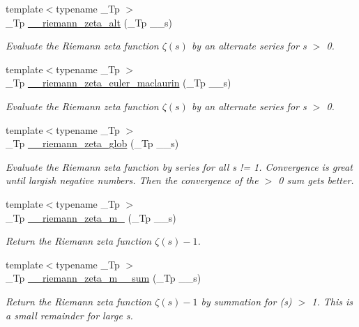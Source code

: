 \begin{DoxyCompactItemize}
{\footnotesize template$<$typename \+\_\+\+Tp $>$ }\\\+\_\+\+Tp \hyperlink{namespacestd_1_1____detail_a4b3f83cafed65af679eedcf37fefff00}{\+\_\+\+\_\+riemann\+\_\+zeta\+\_\+alt} (\+\_\+\+Tp \+\_\+\+\_\+s)
\begin{DoxyCompactList}\small\item\em Evaluate the Riemann zeta function $ \zeta(s) $ by an alternate series for s $>$ 0. \end{DoxyCompactList}\item 
{\footnotesize template$<$typename \+\_\+\+Tp $>$ }\\\+\_\+\+Tp \hyperlink{namespacestd_1_1____detail_a84ac805996c4eeb8cbfa181e6e47f0ae}{\+\_\+\+\_\+riemann\+\_\+zeta\+\_\+euler\+\_\+maclaurin} (\+\_\+\+Tp \+\_\+\+\_\+s)
\begin{DoxyCompactList}\small\item\em Evaluate the Riemann zeta function $ \zeta(s) $ by an alternate series for s $>$ 0. \end{DoxyCompactList}\item 
{\footnotesize template$<$typename \+\_\+\+Tp $>$ }\\\+\_\+\+Tp \hyperlink{namespacestd_1_1____detail_ab3542ea44b34da3d4865ed9a014e2951}{\+\_\+\+\_\+riemann\+\_\+zeta\+\_\+glob} (\+\_\+\+Tp \+\_\+\+\_\+s)
\begin{DoxyCompactList}\small\item\em Evaluate the Riemann zeta function by series for all s != 1. Convergence is great until largish negative numbers. Then the convergence of the $>$ 0 sum gets better. \end{DoxyCompactList}\item 
{\footnotesize template$<$typename \+\_\+\+Tp $>$ }\\\+\_\+\+Tp \hyperlink{namespacestd_1_1____detail_a174bfa28eeb176b90ff251b5affbecb2}{\+\_\+\+\_\+riemann\+\_\+zeta\+\_\+m\+\_} (\+\_\+\+Tp \+\_\+\+\_\+s)
\begin{DoxyCompactList}\small\item\em Return the Riemann zeta function $ \zeta(s) - 1 $. \end{DoxyCompactList}\item 
{\footnotesize template$<$typename \+\_\+\+Tp $>$ }\\\+\_\+\+Tp \hyperlink{namespacestd_1_1____detail_a3985751e758b45d726ea8dec0450ca1e}{\+\_\+\+\_\+riemann\+\_\+zeta\+\_\+m\+\_\+\_\+sum} (\+\_\+\+Tp \+\_\+\+\_\+s)
\begin{DoxyCompactList}\small\item\em Return the Riemann zeta function $ \zeta(s) - 1 $ by summation for (s) $>$ 1. This is a small remainder for large s. \end{DoxyCompactList}\item 

\end{DoxyCompactItemize}
